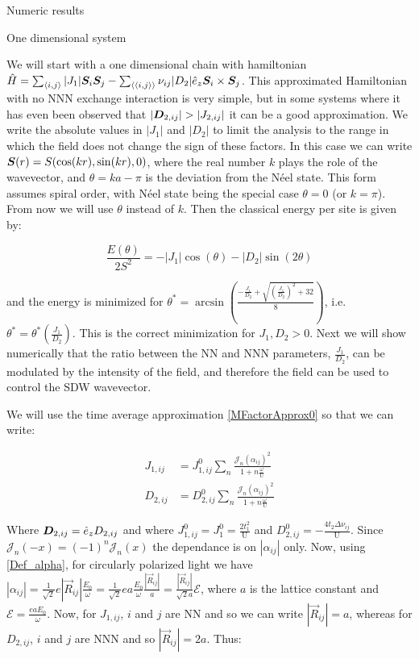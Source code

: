 \begin{section}{Numeric results}
\label{Numerics}

\begin{subsection}{One dimensional system}

We will start with a one dimensional chain with hamiltonian $\hat{H} = \sum_{\langle i,j \rangle} |J_1| \boldsymbol{S}_i\boldsymbol{S}_j - \sum_{\langle \langle i,j \rangle \rangle} \nu_{ij}|D_2|\hat{e}_z\boldsymbol{S}_i \times \boldsymbol{S}_j$. This approximated Hamiltonian with no NNN exchange interaction is very simple, but in some systems where it has even been observed that $|\boldsymbol{D}_{2,ij}| > |J_{2,ij}|$ \cite{Chen2018} it can be a good approximation.  We write the absolute values in $|J_1|$ and $|D_2|$ to limit the analysis to the range in which the field does not change the sign of these factors. In this case we can write $\boldsymbol{S}(r) = S(\cos(kr), \sin(kr), 0)$, where the real number $k$ plays the role of the wavevector, and $\theta = ka-\pi$ is the deviation from the N\'eel state. This form assumes spiral order, with N\'eel state being the special case $\theta = 0$ (or $k = \pi$). From now we will use $\theta$ instead of $k$. Then the classical energy per site is given by:

\begin{equation}
\frac{E(\theta)}{2S^2} = -|J_1|\cos(\theta) - |D_2|\sin(2 \theta)
\end{equation}

and the energy is minimized for $\theta^* = \arcsin(\frac{-\frac{J_1}{D_2} + \sqrt{(\frac{J_1}{D_2})^2+32}}{8})$, i.e. $\theta^* = \theta^*(\frac{J_1}{D_2})$. This is the correct minimization for $J_1, D_2 > 0$. Next we will show numerically that the ratio between the NN and NNN parameters, $\frac{J_1}{D_2}$, can be modulated by the intensity of the field, and therefore the field can be used to control the SDW wavevector. 

We will use the time average approximation \ref{MFactorApprox0} so that we can write:

\begin{align}
J_{1,ij} &= J_{1,ij}^0  \sum_{n} \frac{\mathcal{J}_n(\alpha_{ij})^2}{1+n\frac{\omega}{\text{U}}} \\
D_{2,ij} &= D_{2,ij}^0  \sum_{n} \frac{\mathcal{J}_n(\alpha_{ij})^2}{1+n\frac{\omega}{\text{U}}}
\end{align}

Where $\boldsymbol{D}_{2,ij} = \hat{e}_z D_{2,ij}$ and where $J_{1,ij}^0 = J_{1}^0 = \frac{2t_1^2}{\text{U}}$ and $D_{2,ij}^0 = -\frac{4t_2\Delta\nu_{ij}}{\text{U}}$. Since $\mathcal{J}_n(-x) = (-1)^n\mathcal{J}_n(x)$ the dependance is on $|\alpha_{ij}|$ only. Now, using \ref{Def_alpha}, for circularly polarized light we have $|\alpha_{ij}| = \frac{1}{\sqrt{2}}e|\vec{R}_{ij}| \frac{E_0}{\omega} = \frac{1}{\sqrt{2}}ea \frac{E_0}{\omega} \frac{|\vec{R}_{ij}|}{a} = \frac{|\vec{R}_{ij}|}{\sqrt{2}a} \mathcal{E}$, where $a$ is the lattice constant and $\mathcal{E} = \frac{eaE_0}{\omega}$. Now, for $J_{1,ij}$, $i$ and $j$ are NN and so we can write $|\vec{R}_{ij}|=a$, whereas for $D_{2,ij}$, $i$ and $j$ are NNN and so $|\vec{R}_{ij}|=2a$. Thus:


\end{subsection}
\end{section}
